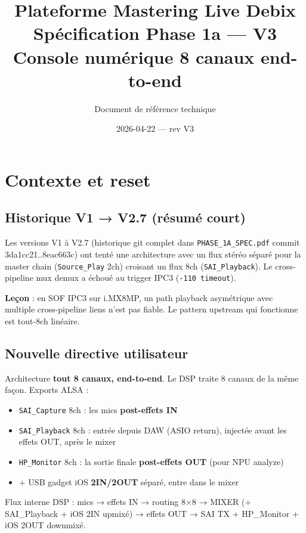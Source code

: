 \documentclass[11pt,a4paper]{article}
\title{\textbf{Plateforme Mastering Live Debix}\\[6pt]
  \Large Spécification Phase 1a --- \textbf{V3}\\[4pt]
  \large Console numérique 8 canaux end-to-end}
\author{Document de référence technique}
\date{2026-04-22 --- rev V3}
\begin{document}
\maketitle
\tableofcontents
\clearpage

\section{Contexte et reset}

\subsection{Historique V1 → V2.7 (résumé court)}

Les versions V1 à V2.7 (historique git complet dans \texttt{PHASE\_1A\_SPEC.pdf} commit 3da1cc21..8eac663c) ont tenté une architecture avec un flux stéréo séparé pour la master chain (\texttt{Source\_Play} 2ch) croisant un flux 8ch (\texttt{SAI\_Playback}). Le cross-pipeline mux demux a échoué au trigger IPC3 (\texttt{-110 timeout}).

\textbf{Leçon} : en SOF IPC3 sur i.MX8MP, un path playback asymétrique avec multiple cross-pipeline liens n'est pas fiable. Le pattern upstream qui fonctionne est tout-8ch linéaire.

\subsection{Nouvelle directive utilisateur}

Architecture \textbf{tout 8 canaux, end-to-end}. Le DSP traite 8 canaux de la même façon. Exports ALSA :
\begin{itemize}[leftmargin=*, itemsep=2pt]
  \item \texttt{SAI\_Capture} 8ch : les mics \textbf{post-effets IN}
  \item \texttt{SAI\_Playback} 8ch : entrée depuis DAW (ASIO return), injectée avant les effets OUT, après le mixer
  \item \texttt{HP\_Monitor} 8ch : la sortie finale \textbf{post-effets OUT} (pour NPU analyze)
  \item + USB gadget iOS \textbf{2IN/2OUT} séparé, entre dans le mixer
\end{itemize}

Flux interne DSP : mics → effets IN → routing 8×8 → MIXER (+ SAI\_Playback + iOS 2IN upmixé) → effets OUT → SAI TX + HP\_Monitor + iOS 2OUT downmixé.
\end{document}
